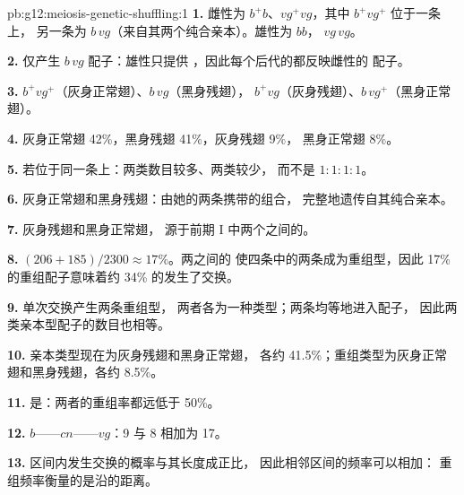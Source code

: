 \begin{solution}{pb:g12:meiosis-genetic-shuffling:1}
\textbf{1.} 雌性为 $b^+b$、$vg^+vg$，其中 $b^+vg^+$ 位于一条上，
另一条为 $b\,vg$（来自其两个纯合亲本）。雄性为 $bb$，
$vg\,vg$。

\textbf{2.} 仅产生 $b\,vg$ 配子：雄性只提供
，因此每个后代的都反映雌性的
配子。

\textbf{3.} $b^+vg^+$（灰身正常翅）、$b\,vg$（黑身残翅），
$b^+vg$（灰身残翅）、$b\,vg^+$（黑身正常翅）。

\textbf{4.} 灰身正常翅 42\%，黑身残翅 41\%，灰身残翅 9\%，
黑身正常翅 8\%。

\textbf{5.} 若位于同一条上：两类数目较多、两类较少，
而不是 $1:1:1:1$。

\textbf{6.} 灰身正常翅和黑身残翅：由她的两条携带的组合，
完整地遗传自其纯合亲本。

\textbf{7.} 灰身残翅和黑身正常翅，
源于前期 I 中两个之间的。

\textbf{8.} $(206 + 185)/2300 \approx 17\%$。两之间的
使四条中的两条成为重组型，因此 17\%
的重组配子意味着约 34\% 的发生了交换。

\textbf{9.} 单次交换产生两条重组型，
两者各为一种类型；两条均等地进入配子，
因此两类亲本型配子的数目也相等。

\textbf{10.} 亲本类型现在为灰身残翅和黑身正常翅，
各约 41.5\%；重组类型为灰身正常翅和黑身残翅，各约
8.5\%。

\textbf{11.} 是：两者的重组率都远低于 50\%。

\textbf{12.} $b$——$cn$——$vg$：9 与 8 相加为 17。

\textbf{13.} 区间内发生交换的概率与其长度成正比，
因此相邻区间的频率可以相加：
重组频率衡量的是沿的距离。


\end{solution}
